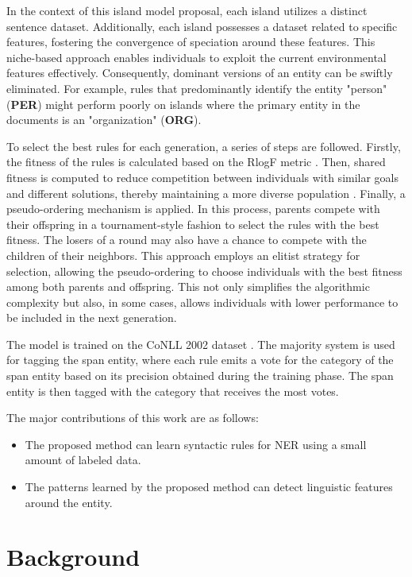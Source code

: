 In the context of this island model proposal, each island utilizes a distinct sentence dataset. Additionally, each island possesses a dataset related to specific features, fostering the convergence of speciation around these features. This niche-based approach enables individuals to exploit the current environmental features effectively. Consequently, dominant versions of an entity can be swiftly eliminated. For example, rules that predominantly identify the entity "person" (\textbf{PER}) might perform poorly on islands where the primary entity in the documents is an "organization" (\textbf{ORG}).

To select the best rules for each generation, a series of steps are followed. Firstly, the fitness of the rules is calculated based on the RlogF metric \cite{seman_lex}. Then, shared fitness is computed to reduce competition between individuals with similar goals and different solutions, thereby maintaining a more diverse population \cite{goldber_mul}. Finally, a pseudo-ordering mechanism is applied. In this process, parents compete with their offspring in a tournament-style fashion to select the rules with the best fitness. The losers of a round may also have a chance to compete with the children of their neighbors. This approach employs an elitist strategy for selection, allowing the pseudo-ordering to choose individuals with the best fitness among both parents and offspring. This not only simplifies the algorithmic complexity but also, in some cases, allows individuals with lower performance to be included in the next generation.

The model is trained on the CoNLL 2002 dataset \cite{tjong-kim-sang-2002-introduction}. The majority system is used for tagging the span entity, where each rule emits a vote for the category of the span entity based on its precision obtained during the training phase. The span entity is then tagged with the category that receives the most votes.

The major contributions of this work are as follows:
\begin{itemize}
  \item The proposed method can learn syntactic rules for NER using a small amount of labeled data.
  \item The patterns learned by the proposed method can detect linguistic features around the entity.
\end{itemize}


\section{Background}
